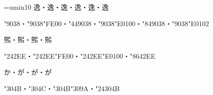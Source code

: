 
\parindent=0pt
\font\jpy=umin10
\jpy
逸・逸︀・逸︁・逸󠄀・逸󠄁・逸󠄂\par
\kchar"9038・\kchar"9038\kchar"FE00・\kchar"449038・\kchar"9038\kchar"E0100・\kchar"849038・\kchar"9038\kchar"E0102\par
𤋮・𤋮︀・𤋮󠄀・𤋮󠄁\par
\kchar"242EE・\kchar"242EE\kchar"FE00・\kchar"242EE\kchar"E0100・\kchar"8642EE\par
か・が・か゚・か゚\par
\kchar"304B・\kchar"304C・\kchar"304B\kchar"309A・\kchar"24304B
\bye
